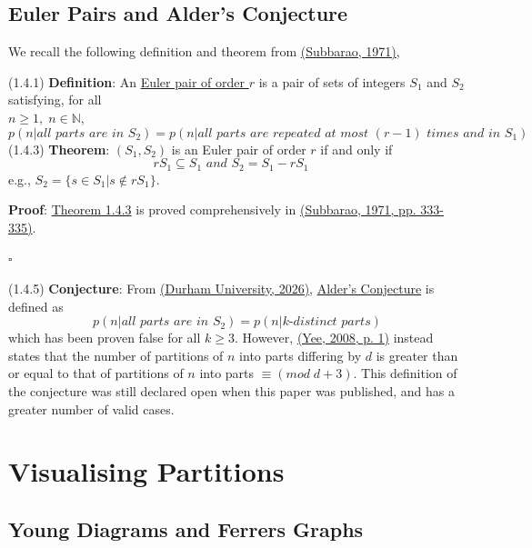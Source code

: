 \documentclass{article}
\newcommand{\separate}[1] {\vspace{#1 pt}\noindent}
\newcommand{\N}{\mathbb{N}}
\newcommand{\definition}[2]{(#1) \textbf{Definition}: #2}
\newcommand{\theorem}[2]{(#1) \textbf{Theorem}: #2}
\newcommand{\conjecture}[2]{(#1) \textbf{Conjecture}: #2}
\newcommand{\proof}[1]{\textbf{Proof}: #1 \begin{flushright}\(\square\)\end{flushright}}
\begin{document}
\subsection{Euler Pairs and Alder's Conjecture}

We recall the following definition and theorem from \hyperref[cit:3]{(Subbarao, 1971)},

\separate{5}\definition{1.4.1}{An \underline{Euler pair of order \(r\)} is a pair of sets of integers \(S_1\) and \(S_2\) satisfying, for all \\ \(n \geq 1, \; n \in \N\),}
\begin{equation}\tag{1.4.2}\label{equ:1.4.2}
    p(n|\textit{all parts are in } S_2) = p(n|\textit{all parts are repeated at most \((r-1)\) times and in } S_1)
\end{equation}
\theorem{1.4.3}{\((S_1,S_2)\) is an Euler pair of order \(r\) if and only if 
\begin{equation}\tag{1.4.4}\label{eq:1.4.4}
    rS_1 \subseteq S_1 \textit{ and } S_2 = S_1 - rS_1 \quad
\end{equation}}\label{thm:1.4.3}
e.g., \(S_2 = \{s \in S_1 | s \notin rS_1\}\).

\separate{2}\proof{\hyperref[thm:1.4.3]{Theorem 1.4.3} is proved comprehensively in \hyperref[cit:3]{(Subbarao, 1971, pp. 333-335)}.}

\separate{5}\conjecture{1.4.5}{From \hyperref[cit:1]{(Durham University, 2026)}, \underline{Alder's Conjecture} is defined as 
\begin{equation}\tag{1.4.6}\label{eq:1.4.6}
    p(n | \textit{all parts are in } S_2) = p(n | \textit{k-distinct parts})
\end{equation}
which has been proven false for all \(k \geq 3\).
However, \hyperref[cit:4]{(Yee, 2008, p. 1)} instead states that the number of partitions of \(n\) into parts differing by \(d\) is greater than or equal to that of partitions of \(n\) into parts \(\equiv (mod \;d  + 3)\). This definition of the conjecture was still declared open when this paper was published, and has a greater number of valid cases.}

\section{Visualising Partitions}

\subsection{Young Diagrams and Ferrers Graphs}
\end{document}
